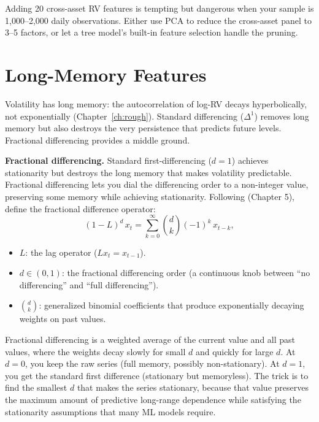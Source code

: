\begin{warning}
Adding 20 cross-asset RV features is tempting but dangerous when your sample is 1,000--2,000 daily observations.
Either use PCA to reduce the cross-asset panel to 3--5 factors, or let a tree model's built-in feature selection handle the pruning.
\end{warning}

\section{Long-Memory Features}\label{sec:feat-longmem}

Volatility has long memory: the autocorrelation of log-RV decays hyperbolically, not exponentially (Chapter~\ref{ch:rough}).
Standard differencing ($\Delta^1$) removes long memory but also destroys the very persistence that predicts future levels.
Fractional differencing provides a middle ground.

\textbf{Fractional differencing.}
Standard first-differencing ($d=1$) achieves stationarity but destroys the long memory that makes volatility predictable. Fractional differencing lets you dial the differencing order to a non-integer value, preserving some memory while achieving stationarity. Following \citet{LopezdePrado2018AFML} (Chapter 5), define the fractional difference operator:
\begin{equation}\label{eq:frac-diff}
(1 - L)^d \, x_t = \sum_{k=0}^{\infty} \binom{d}{k} (-1)^k \, x_{t-k},
\end{equation}
\begin{itemize}[nosep]
  \item $L$: the lag operator ($Lx_t = x_{t-1}$).
  \item $d \in (0,1)$: the fractional differencing order (a continuous knob between ``no differencing'' and ``full differencing'').
  \item $\binom{d}{k}$: generalized binomial coefficients that produce exponentially decaying weights on past values.
\end{itemize}

\begin{intuition}
Fractional differencing is a weighted average of the current value and all past values, where the weights decay slowly for small $d$ and quickly for large $d$. At $d=0$, you keep the raw series (full memory, possibly non-stationary). At $d=1$, you get the standard first difference (stationary but memoryless). The trick is to find the smallest $d$ that makes the series stationary, because that value preserves the maximum amount of predictive long-range dependence while satisfying the stationarity assumptions that many ML models require.
\end{intuition}

